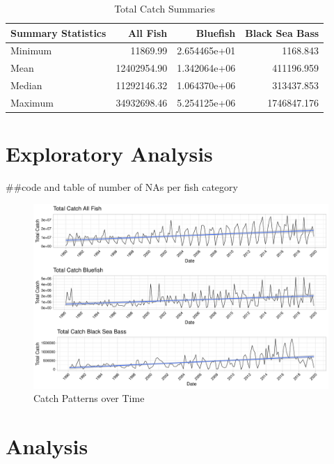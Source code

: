 \documentclass[
  12pt,
]{article}
\begin{document}
\begin{table}[H]

\caption{\label{tab:table2}Total Catch Summaries}
\centering
\begin{tabular}[t]{l|r|r|r}
\hline
Summary Statistics & All Fish & Bluefish & Black Sea Bass\\
\hline
Minimum & 11869.99 & 2.654465e+01 & 1168.843\\
\hline
Mean & 12402954.90 & 1.342064e+06 & 411196.959\\
\hline
Median & 11292146.32 & 1.064370e+06 & 313437.853\\
\hline
Maximum & 34932698.46 & 5.254125e+06 & 1746847.176\\
\hline
\end{tabular}
\end{table}
\newpage

\hypertarget{exploratory-analysis}{%
\section{Exploratory Analysis}\label{exploratory-analysis}}

\#\#code and table of number of NAs per fish category

\begin{figure}
\centering
\includegraphics{Report_FishTrends_files/figure-latex/ggplot-1.pdf}
\caption{Catch Patterns over Time}
\end{figure}

\newpage

\hypertarget{analysis}{%
\section{Analysis}\label{analysis}}
\end{document}
